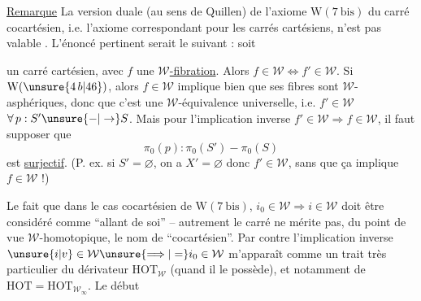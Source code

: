 
\uline{Remarque} La version duale  (au sens de
Quillen) de l'axiome $\mathrm{W}(7\ \mathrm{bis})$ du carré cocartésien, i.e. l'axiome correspondant pour les
carrés cartésiens, n'est pas valable  .
L'énoncé pertinent serait le suivant : soit


un carré cartésien, avec $f$ une \uline{$\mathcal W$-fibration}.
Alors $f\in\mathcal W\Longleftrightarrow f'\in\mathcal W$. Si  \unsure{:}  $\mathrm W(\unsure{4\,b|46})$, alors $f\in\mathcal W$ implique
bien que ses fibres sont $\mathcal W$-asphériques, donc
que c'est une $\mathcal W$-équivalence universelle, i.e. $f'\in\mathcal W$
$\forall\,p:S'\unsure{-|\to}S$. Mais pour l'implication inverse
$f'\in\mathcal W\Rightarrow f\in\mathcal W$, il faut supposer  que
\[
\pi_0(p):\pi_0(S')- \pi_0(S)
\]
est \uline{surjectif}. (P. ex. si $S'=\varnothing$, on a $X'=\varnothing$
donc $f'\in\mathcal W$, sans que ça implique $f\in\mathcal W$ !)

Le fait que dans le cas cocartésien de
$\mathrm W(7\ \mathrm{bis})$, $i_0\in\mathcal W\Rightarrow i\in\mathcal W$ doit être considéré
comme ``allant de soi'' -- autrement le carré
ne mérite pas, du point de vue $\mathcal W$-homotopique, le nom de ``cocartésien''. Par contre
l'implication inverse $\unsure{i|v}\in\mathcal W\unsure{\Longrightarrow|=}i_0\in\mathcal W$ m'apparaît comme un trait très particulier
du dérivateur $\mathrm{HOT}_{\mathcal W}$ (quand il le possède), et
notamment de $\mathrm{HOT}=\mathrm{HOT}_{\mathcal W_\infty}$. Le début

